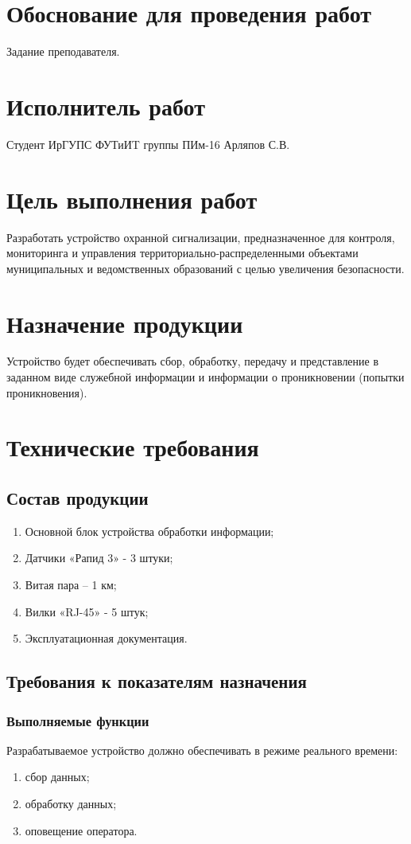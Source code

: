 	\section{Обоснование для проведения работ}
		Задание преподавателя.
	\section{Исполнитель работ}
		Студент ИрГУПС ФУТиИT группы ПИм-16 Арляпов С.В.
	\section{Цель выполнения работ}
		Разработать устройство охранной сигнализации, предназначенное для контроля, мониторинга и управления территориально-распределенными объектами муниципальных и ведомственных образований с целью увеличения безопасности.
	\section{Назначение продукции}
		Устройство будет обеспечивать сбор, обработку, передачу и представление в заданном виде служебной информации и информации о проникновении (попытки проникновения).
	\section{Технические требования}
		\subsection{Состав продукции}
		 	\begin{enumerate}
\changefontsizes[14pt]{14pt}
				\item Основной блок устройства обработки информации;
				\item Датчики «Рапид 3» - 3 штуки;
				\item Витая пара – 1 км;
				\item Вилки «RJ-45» - 5 штук;
				\item Эксплуатационная документация.
			\end{enumerate}
		\subsection{Требования к показателям назначения}
			\subsubsection{Выполняемые функции}
				Разрабатываемое устройство должно обеспечивать в режиме реального времени:
				\begin{enumerate}
\changefontsizes[14pt]{14pt}
					\item сбор данных;
					\item обработку данных;
					\item оповещение оператора.
				\end{enumerate}

